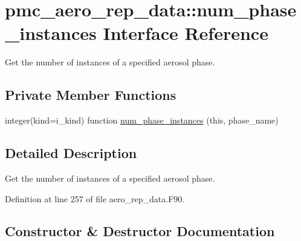 \hypertarget{interfacepmc__aero__rep__data_1_1num__phase__instances}{}\section{pmc\+\_\+aero\+\_\+rep\+\_\+data\+:\+:num\+\_\+phase\+\_\+instances Interface Reference}
\label{interfacepmc__aero__rep__data_1_1num__phase__instances}


Get the number of instances of a specified aerosol phase.  


\subsection*{Private Member Functions}
\begin{DoxyCompactItemize}
\item 
integer(kind=i\+\_\+kind) function \mbox{\hyperlink{interfacepmc__aero__rep__data_1_1num__phase__instances_ab8bbf3575e86ada822390490d4d33501}{num\+\_\+phase\+\_\+instances}} (this, phase\+\_\+name)
\end{DoxyCompactItemize}


\subsection{Detailed Description}
Get the number of instances of a specified aerosol phase. 

Definition at line 257 of file aero\+\_\+rep\+\_\+data.\+F90.



\subsection{Constructor \& Destructor Documentation}
\mbox{\label{interfacepmc__aero__rep__data_1_1num__phase__instances_ab8bbf3575e86ada822390490d4d33501}} 
